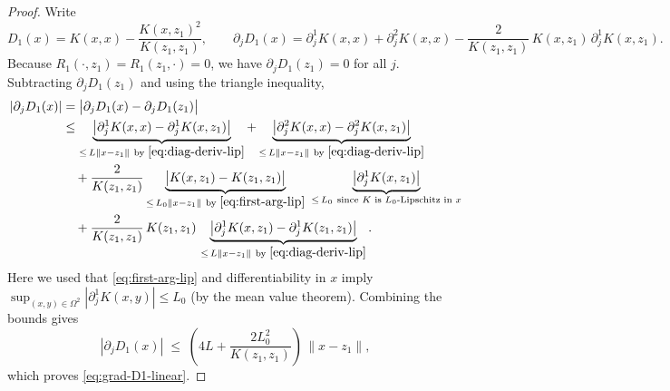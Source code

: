\documentclass[10pt,a4paper]{amsart}
\begin{document}
\begin{proof}
Write
\[
D_1(x)=K(x,x)-\frac{K(x,z_1)^2}{K(z_1,z_1)},\qquad
\partial_j D_1(x)
= \partial_j^1K(x,x)+\partial_j^2K(x,x)
-\frac{2}{K(z_1,z_1)}\,K(x,z_1)\,\partial_j^1K(x,z_1).
\]
Because $R_1(\cdot,z_1)=R_1(z_1,\cdot)=0$, we have $\partial_j D_1(z_1)=0$ for all $j$.
Subtracting $\partial_j D_1(z_1)$ and using the triangle inequality,
\begin{align*}
|\partial_j D_1(x)|
&= \bigl|\partial_j D_1(x)-\partial_j D_1(z_1)\bigr| \\
&\le \underbrace{\bigl|\partial_j^1K(x,x)-\partial_j^1K(x,z_1)\bigr|}_{\le\, L\|x-z_1\|\ \text{by }\eqref{eq:diag-deriv-lip}}
+\underbrace{\bigl|\partial_j^2K(x,x)-\partial_j^2K(x,z_1)\bigr|}_{\le\, L\|x-z_1\|\ \text{by }\eqref{eq:diag-deriv-lip}} \\
&\quad + \frac{2}{K(z_1,z_1)}
\underbrace{\bigl|K(x,z_1)-K(z_1,z_1)\bigr|}_{\le\, L_0\|x-z_1\|\ \text{by }\eqref{eq:first-arg-lip}}
\ \underbrace{\bigl|\partial_j^1K(x,z_1)\bigr|}_{\le\, L_0\ \text{since }K\text{ is }L_0\text{-Lipschitz in }x} \\
&\quad + \frac{2}{K(z_1,z_1)}\,K(z_1,z_1)\,
\underbrace{\bigl|\partial_j^1K(x,z_1)-\partial_j^1K(z_1,z_1)\bigr|}_{\le\, L\|x-z_1\|\ \text{by }\eqref{eq:diag-deriv-lip}}.
\end{align*}
Here we used that \cref{eq:first-arg-lip} and differentiability in $x$ imply
\(
\sup_{(x,y)\in\Omega^2}|\partial_j^{1}K(x,y)|\le L_0
\)
(by the mean value theorem). Combining the bounds gives
\[
|\partial_j D_1(x)| \;\le\; \left(4L + \frac{2L_0^2}{K(z_1,z_1)}\right)\,\|x-z_1\|,
\]
which proves \cref{eq:grad-D1-linear}.
\end{proof}
\end{document}
